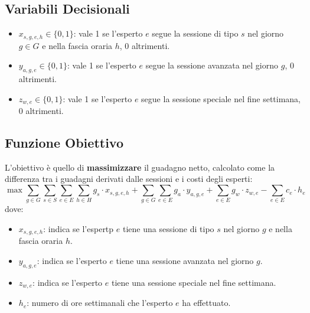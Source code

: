 \documentclass[12pt]{article}
\begin{document}
    \subsection{Variabili Decisionali}
    \begin{itemize}
        \item $x_{s,g,e,h} \in \{0,1\}$: vale 1 se l'esperto $e$ segue la sessione di tipo $s$ nel giorno $g \in G$ e nella fascia oraria $h$, 0 altrimenti.
        \item $y_{a,g,e} \in \{0,1\}$: vale 1 se l'esperto $e$ segue la sessione avanzata nel giorno $g$, 0 altrimenti.
        \item $z_{w,e} \in \{0,1\}$: vale 1 se l'esperto $e$ segue la sessione speciale nel fine settimana, 0 altrimenti.
    \end{itemize}
    \subsection{Funzione Obiettivo}
    L'obiettivo è quello di \textbf{massimizzare} il guadagno netto, calcolato come la differenza tra i guadagni derivati dalle sessioni e i costi degli esperti:
    \begin{equation}
        \max \sum_{g \in G}\sum_{s \in S}\sum_{e \in E}\sum_{h \in H} g_s \cdot x_{s,g,e,h} + \sum_{g \in G}\sum_{e \in E} g_a \cdot y_{a,g,e} + \sum_{e \in E} g_w \cdot z_{w,e} - \sum_{e \in E} c_e \cdot h_e
    \end{equation}
    dove:
    \begin{itemize}
        \item $x_{s,g,e,h}$: indica se l'espertp $e$ tiene una sessione di tipo $s$ nel giorno $g$ e nella fascia oraria $h$.
        \item $y_{a,g,e}$: indica se l'esperto $e$ tiene una sessione avanzata nel giorno $g$.
        \item $z_{w,e}$: indica se l'esperto $e$ tiene una sessione speciale nel fine settimana.
        \item $h_e$: numero di ore settimanali che l'esperto $e$ ha effettuato.
    \end{itemize}
\end{document}
